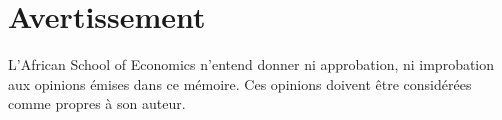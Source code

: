\chapter*{Avertissement}

\begin{center}

    L’African School of Economics n’entend donner ni approbation, ni improbation aux opinions émises dans ce mémoire. Ces opinions doivent être considérées comme propres à son auteur. 

\end{center}
